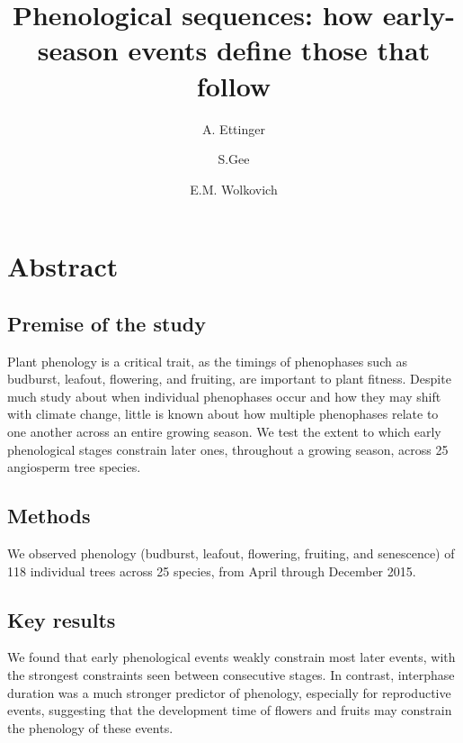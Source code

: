\documentclass{article}
\begin{document}


\title{Phenological sequences: how early-season events define those that follow} %
\author[1,2,a]{A. Ettinger}
\author[1]{S.Gee}
\author[1,3]{E.M. Wolkovich}

\maketitle %

\section*{Abstract}
\subsection*{Premise of the study}
Plant phenology is a critical trait, as the timings of phenophases such as budburst, leafout, flowering, and fruiting, are important to plant fitness. Despite much study about when individual phenophases occur and how they may shift with climate change, little is known about how multiple phenophases relate to one another across an entire growing season. We test the extent to which early phenological stages constrain later ones, throughout a growing season, across 25 angiosperm tree species. 
\subsection*{Methods}
We observed phenology (budburst, leafout, flowering, fruiting, and senescence) of 118 individual trees across 25 species, from April through December 2015. 
\subsection*{Key results}
We found that early phenological events weakly constrain most later events, with the strongest constraints seen between consecutive stages. In contrast, interphase duration was a much stronger predictor of phenology, especially for reproductive events, suggesting that the development time of flowers and fruits may constrain the phenology of these events.
\end{document}
